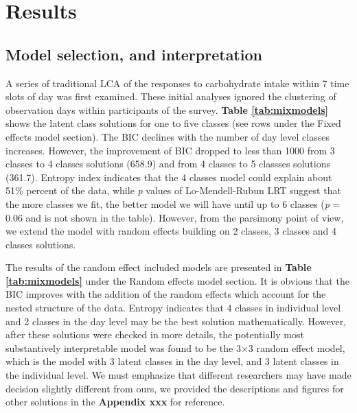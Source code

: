 
\chapter{Results} %

\label{Chapter 3} %





\section{Model selection, and interpretation}\vspace{-0.4cm}

A series of traditional LCA of the responses to carbohydrate intake within 7 time slots of day was first examined. These initial analyses ignored the clustering of observation days within participants of the survey. \textbf{Table \ref{tab:mixmodels}} shows the latent class solutions for one to five classes (see rows under the Fixed effects model section). The BIC declines with the number of day level classes increases. However, the improvement of BIC dropped to less than 1000 from 3 classes to 4 classes solutions (658.9) and from 4 classes to 5 classses solutions (361.7). Entropy index indicates that the 4 classes model could explain about 51\% percent of the data, while \textit{p} values of Lo-Mendell-Rubun LRT suggest that the more classes we fit, the better model we will have until up to 6 classes (\textit{p} = 0.06 and is not shown in the table). However, from the parsimony point of view, we extend the model with random effects building on 2 classes, 3 classes and 4 classes solutions. 

The results of the random effect included models are presented in \textbf{Table \ref{tab:mixmodels}} under the Random effects model section. It is obvious that the BIC improves with the addition of the random effects which account for the nested structure of the data. Entropy indicates that 4 classes in individual level and 2 classes in the day level may be the best solution mathematically. However, after these solutions were checked in more details, the potentially most substantively interpretable model was found to be the 3$\times$3 random effect model, which is the model with 3 latent classes in the day level, and 3 latent classes in the individual level. We must emphasize that different researchers may have made decision slightly different from ours, we provided the descriptions and figures for other solutions in the \textbf{Appendix xxx} for reference. 


